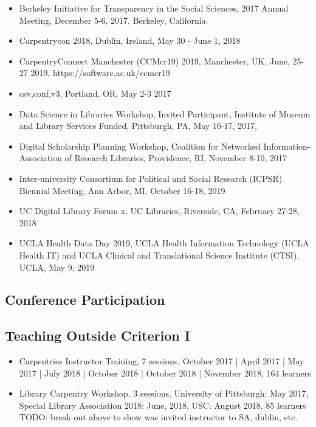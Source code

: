 \begin{itemize}[label={},leftmargin=!,labelindent=5pt,itemindent=-15pt]
  \item Berkeley Initiative for Transparency in the Social Sciences, 2017 Annual Meeting, December 5-6, 2017, Berkeley, California
  \item Carpentrycon 2018, Dublin, Ireland, May 30 - June 1, 2018
  \item CarpentryConnect Manchester (CCMcr19) 2019, Manchester, UK, June, 25-27 2019, https://software.ac.uk/ccmcr19
  \item csv,conf,v3, Portland, OR, May 2-3 2017
  \item Data Science in Libraries Workshop, Invited Participant, Institute of Museum and Library Services Funded, Pittsburgh, PA, May 16-17, 2017,
  \item Digital Scholarship Planning Workshop, Coalition for Networked Information-Association of Research Libraries, Providence, RI, November 8-10, 2017
  \item Inter-university Consortium for Political and Social Research (ICPSR) Biennial Meeting, Ann Arbor, MI, October 16-18, 2019
  \item UC Digital Library Forum x, UC Libraries, Riverside, CA, February 27-28, 2018
  \item UCLA Health Data Day 2019, UCLA Health Information Technology (UCLA Health IT) and UCLA Clinical and Translational Science Institute (CTSI), UCLA, May 9, 2019
\end{itemize}


\subsection{Conference Participation}

\nocite{*}
\printbibliography[keyword={outlib-conf-part},title={Conference Participation},heading=none]


\subsection{Teaching Outside Criterion I}
\begin{itemize}[label={},leftmargin=!,labelindent=5pt,itemindent=-15pt]
  \item Carpentries Instructor Training, 7 sessions, October 2017 | April	2017 | May	2017 | July	2018 | October 2018 | October	2018 | November 2018,	164 learners
  \item Library Carpentry Workshop, 3 sessions, University of Pittsburgh: May	2017, Special Library Association 2018: June, 2018, USC: August	2018,	85 learners
  TODO: break out above to show was invited instructor to SA, dublin, etc.
\end{itemize}
